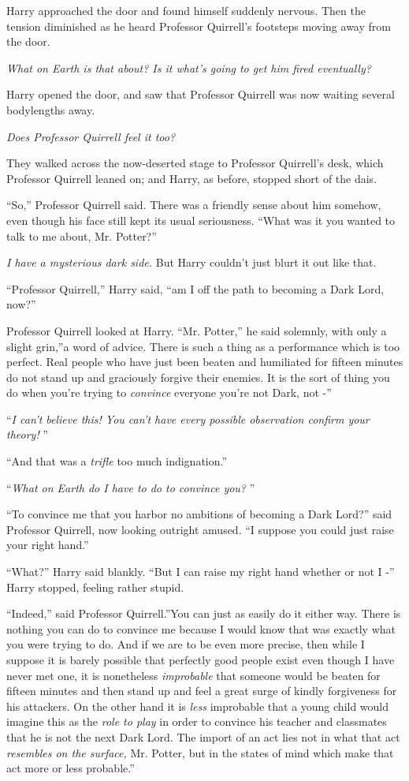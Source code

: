 Harry approached the door and found himself suddenly nervous. Then the
tension diminished as he heard Professor Quirrell's footsteps moving
away from the door.

\emph{What on Earth is that about? Is it what's going to get him fired
eventually?}

Harry opened the door, and saw that Professor Quirrell was now waiting
several bodylengths away.

\emph{Does Professor Quirrell feel it too?}

They walked across the now-deserted stage to Professor Quirrell's desk,
which Professor Quirrell leaned on; and Harry, as before, stopped short
of the dais.

``So,'' Professor Quirrell said. There was a friendly sense about him
somehow, even though his face still kept its usual seriousness. ``What
was it you wanted to talk to me about, Mr. Potter?''

\emph{I have a mysterious dark side.} But Harry couldn't just blurt it
out like that.

``Professor Quirrell,'' Harry said, ``am I off the path to becoming a
Dark Lord, now?''

Professor Quirrell looked at Harry. ``Mr. Potter,'' he said solemnly,
with only a slight grin,''a word of advice. There is such a thing as a
performance which is too perfect. Real people who have just been beaten
and humiliated for fifteen minutes do not stand up and graciously
forgive their enemies. It is the sort of thing you do when you're trying
to \emph{convince} everyone you're not Dark, not -''

``\emph{I can't believe this! You can't have every possible observation
confirm your theory!} ''

``And that was a \emph{trifle} too much indignation.''

``\emph{What on Earth do I have to do to convince you?} ''

``To convince me that you harbor no ambitions of becoming a Dark Lord?''
said Professor Quirrell, now looking outright amused. ``I suppose you
could just raise your right hand.''

``What?'' Harry said blankly. ``But I can raise my right hand whether or
not I -'' Harry stopped, feeling rather stupid.

``Indeed,'' said Professor Quirrell.''You can just as easily do it
either way. There is nothing you can do to convince me because I would
know that was exactly what you were trying to do. And if we are to be
even more precise, then while I suppose it is barely possible that
perfectly good people exist even though I have never met one, it is
nonetheless \emph{improbable} that someone would be beaten for fifteen
minutes and then stand up and feel a great surge of kindly forgiveness
for his attackers. On the other hand it is \emph{less} improbable that a
young child would imagine this as the \emph{role to play} in order to
convince his teacher and classmates that he is not the next Dark Lord.
The import of an act lies not in what that act \emph{resembles on the
surface,} Mr. Potter, but in the states of mind which make that act more
or less probable.''

